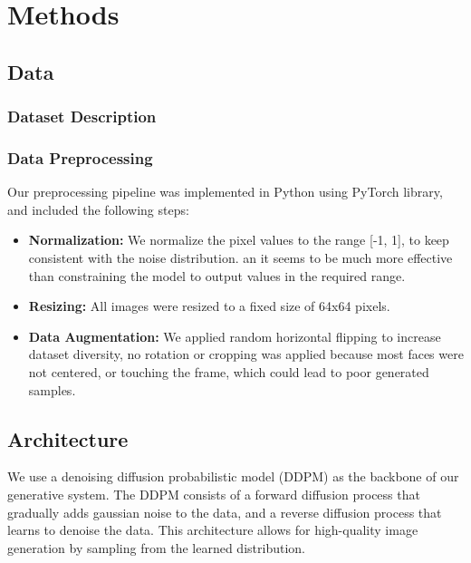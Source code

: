 \documentclass[twocolumn,superscriptaddress,aps]{revtex4-1}
\begin{document}
\section{Methods}
\subsection{Data}
\subsubsection{Dataset Description}


\subsubsection{Data Preprocessing}
Our preprocessing pipeline was implemented in Python using PyTorch library, and included the following steps:

\begin{itemize}
    \item \textbf{Normalization:} We normalize the pixel values to the range [-1, 1], to keep consistent with the noise distribution. an it seems to be much more effective than constraining the model to output values in the required range.
    \item \textbf{Resizing:} All images were resized to a fixed size of 64x64 pixels.
    \item \textbf{Data Augmentation:} We applied random horizontal flipping to increase dataset diversity, no rotation or cropping was applied because most faces were not centered, or touching the frame, which could lead to poor generated samples.
\end{itemize}

\subsection{Architecture}
We use a denoising diffusion probabilistic model (DDPM) as the backbone of our generative system. The DDPM consists of a forward diffusion process that gradually adds gaussian noise to the data, and a reverse diffusion process that learns to denoise the data. This architecture allows for high-quality image generation by sampling from the learned distribution.
\end{document}
